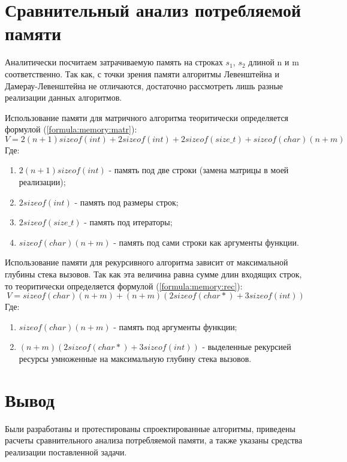     \section{Сравнительный анализ потребляемой памяти}  
        Аналитически посчитаем затрачиваемую память на строках $s_1$, $s_2$ длиной n и m соответственно. Так как, с точки зрения памяти алгоритмы Левенштейна и Дамерау-Левенштейна не отличаются, достаточно рассмотреть лишь разные реализации данных алгоритмов.
        
        Использование памяти для матричного алгоритма теоритически определяется формулой (\ref{formula:memory:matr}):
        \begin{equation}
            V = 2(n+1)sizeof(int) + 2sizeof(int) + 2sizeof(size\_t) + sizeof(char)(n + m)
            \label{formula:memory:matr}
        \end{equation}
    	Где:
    	\begin{enumerate}
    			\item $2(n+1)sizeof(int)$ - память под две строки (замена матрицы в моей реализации);
    			\item $2sizeof(int)$ - память под размеры строк;
    			\item $2sizeof(size\_t)$ - память под итераторы;
    			\item $sizeof(char)(n + m)$ - память под сами строки как аргументы функции.
    	\end{enumerate}
        

        Использование памяти для рекурсивного алгоритма зависит от максимальной глубины стека вызовов. Так как эта величина равна сумме длин входящих строк, то теоритически определяется формулой (\ref{formula:memory:rec}):
        \begin{equation}
            V = sizeof(char)(n + m)  + (n + m)(2sizeof(char*) + 3sizeof(int))
            \label{formula:memory:rec}
        \end{equation}
        	Где:
    	\begin{enumerate}
    		\item $sizeof(char)(n + m)$ - память под аргументы функции;
    		\item $(n + m)(2sizeof(char*) + 3sizeof(int))$ - выделенные рекурсией ресурсы умноженные на максимальную глубину стека вызовов.
   	    \end{enumerate}
	
	\section*{Вывод}
	
	
	Были разработаны и протестированы спроектированные алгоритмы, приведены расчеты сравнительного анализа потребляемой памяти, а также указаны средства реализации поставленной задачи.
    	
\newpage